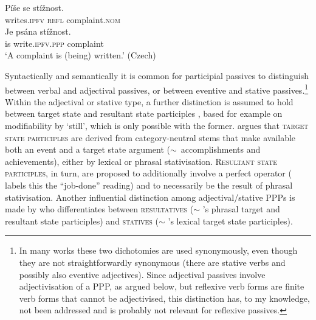 \documentclass[output=paper,colorlinks,citecolor=brown]{langscibook}
\begin{document}
\ea \label{ex:czpasstypes}
\ea 
\gll Píše se stížnost. \\
	writes.\textsc{ipfv} \textsc{refl} complaint.\textsc{nom} \\
\ex	
\gll Je psána stížnost.\\
	is write.\textsc{ipfv.ppp} complaint \\
\z	
`A complaint is (being) written.' \hfill (Czech)
\z 

\noindent Syntactically and semantically it is common for participial passives to distinguish between verbal and adjectival passives, or between eventive and stative passives.\footnote{In many works these two dichotomies are used synonymously, even though they are not straightforwardly synonymous (there are stative verbs and possibly also eventive adjectives). Since adjectival passives involve adjectivisation of a PPP, as argued below, but reflexive verb forms are finite verb forms that cannot be adjectivised, this distinction has, to my knowledge, not been addressed and is probably not relevant for reflexive passives.} Within the adjectival or stative type, a further distinction is assumed to hold between target state and resultant state participles \citep[following][]{kratzer00}, based for example on modifiability by `still', which is only possible with the former. \citeauthor{kratzer00} argues that \textsc{target state participles} are derived from category-neutral stems that make available both an event and a target state argument ($\sim$~accomplishments and achievements), either by lexical or phrasal stativisation. \textsc{Resultant state participles}, in turn, are proposed to additionally involve a perfect operator (\citeauthor{kratzer00} labels this the ``job-done'' reading) and to necessarily be the result of phrasal stativisation. Another influential distinction among adjectival/stative PPPs is made by \citet{embick04} who differentiates between \textsc{resultatives} ($\sim$ \citeauthor{kratzer00}'s phrasal target and resultant state participles) and \textsc{statives} ($\sim$ \citeauthor{kratzer00}'s lexical target state participles).%
\end{document}
